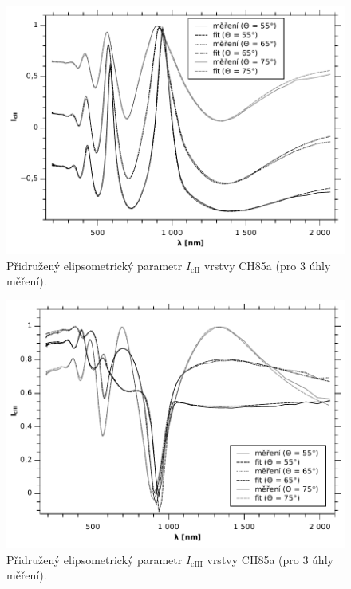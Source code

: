 \documentclass[12pt]{article}
\begin{document}
\begin{figure}
  \centering
  \includegraphics[width=135mm]{img/CH85-ic2.pdf}
  \caption{Přidružený elipsometrický parametr $I_\mathrm{cII}$ vrstvy CH85a (pro 3 úhly měření).}
  \label{CH85ic2}
\end{figure}

\begin{figure}
  \centering
  \includegraphics[width=135mm]{img/CH85-ic3.pdf}
  \caption{Přidružený elipsometrický parametr $I_\mathrm{cIII}$ vrstvy CH85a (pro 3 úhly měření).}
  \label{CH85ic3}
\end{figure}
\end{document}
